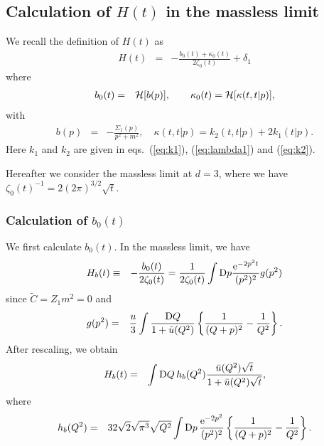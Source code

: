 \documentclass[preprint]{ptephy_v1}%
\newcommand{\rme}{{\rm e}}
\newcommand{\rmD}{{\rm D}}
\begin{document}
\subsection{Calculation of $H(t)$ in the massless limit}
We recall the definition of $H(t)$ as
\begin{eqnarray}
H(t) &=& -\frac{b_0(t) +\kappa_0(t)}{2\zeta_0(t)} +\delta_1
\end{eqnarray}
where
\begin{eqnarray}
b_0(t)&=&{\cal H}[b(p)], \qquad \kappa_0(t) ={\cal H}[\kappa(t,t\vert p)],
\end{eqnarray}
with
\begin{eqnarray}
b(p) &=& -\frac{\Sigma_1(p)}{p^2+m^2}, \quad
\kappa(t,t\vert p) = k_2(t,t \vert p) + 2 k_1(t\vert p) .
\end{eqnarray}
 Here  $k_1$ and $k_2$ are given in eqs.~(\ref{eq:k1}), (\ref{eq:lambda1}) and (\ref{eq:k2}).

Hereafter we consider the massless limit at $d=3$, where we have
$\zeta_0(t)^{-1} = 2(2\pi)^{3/2} \sqrt{t}$.

\subsubsection{Calculation of $b_0(t)$}
We first calculate $b_0(t)$.  In the massless limit, we have
\begin{eqnarray}
H_b(t) &\equiv& -\frac{b_0(t)}{2\zeta_0(t)} =\frac{1}{2\zeta_0(t)}\int \rmD p \frac{\rme^{-2p^2 t}} {(p^2)^2} g(p^2) 
\end{eqnarray}
 since $\tilde C = Z_1 m^2 =0$ and
\begin{eqnarray}
g(p^2) &=&\frac{u}{3} \int \frac{\rmD Q}{1+\bar u(Q^2)}\left\{\frac{1}{(Q+p)^2} -\frac{1}{Q^2} \right\}.
\end{eqnarray}
After rescaling, we obtain 
\begin{eqnarray}
H_b(t) &=& \int \rmD Q\, h_b(Q^2) \frac{\bar u(Q^2) \sqrt{t}}{1+\bar u(Q^2) \sqrt{t}},
\end{eqnarray}
where
\begin{eqnarray}
h_b(Q^2) &=& 32\sqrt{2} \sqrt{\pi^3}\sqrt{Q^2} \int \rmD p\, \frac{\rme^{-2p^2}}{(p^2)^2} \left\{ \frac{1}{(Q+p)^2}-\frac{1}{Q^2}\right\} .
\end{eqnarray}
\end{document}
